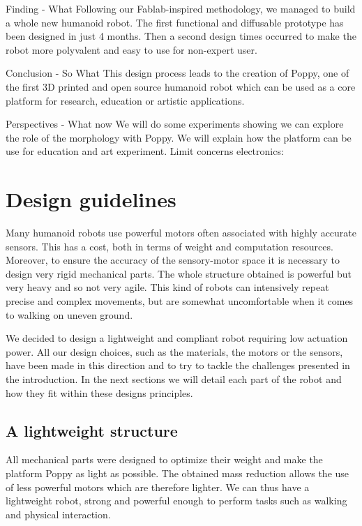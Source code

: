 Finding - What
Following our Fablab-inspired methodology, we managed to build a whole new humanoid robot. The first functional and diffusable prototype has been designed in just 4 months. Then a second design times occurred to make the robot more polyvalent and easy to use for non-expert user.

Conclusion - So What
This design process leads to the creation of Poppy, one of the first 3D printed and open source humanoid robot which can be used as a core platform for research, education or artistic applications.

Perspectives - What now
We will do some experiments showing we can explore the role of the morphology with Poppy.
We will explain how the platform can be use for education and art experiment.
Limit concerns electronics:




\section{Design guidelines} %

Many humanoid robots use powerful motors often associated with highly accurate sensors. This has a cost, both in terms of weight and computation resources. Moreover, to ensure the accuracy of the sensory-motor space it is necessary to design very rigid mechanical parts. The whole structure obtained is powerful but very heavy and so not very agile. This kind of robots can intensively repeat precise and complex movements, but are somewhat uncomfortable when it comes to walking on uneven ground.

We decided to design a lightweight and compliant robot requiring low actuation power. All our design choices, such as the materials, the motors or the sensors, have been made in this direction and to try to tackle the challenges presented in the introduction. In the next sections we will detail each part of the robot and how they fit within these designs principles.

\subsection{A lightweight structure} %

All mechanical parts were designed to optimize their weight and make the platform Poppy as light as possible. The obtained mass reduction allows the use of less powerful motors which are therefore lighter. We can thus have a lightweight robot, strong and powerful enough to perform tasks such as walking and physical interaction.

